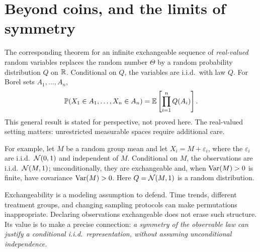 \section{Beyond coins, and the limits of symmetry}

The corresponding theorem for an infinite exchangeable sequence of \emph{real-valued} random variables replaces the random number $\Theta$ by a random probability distribution $Q$ on $\mathbb R$. Conditional on $Q$, the variables are i.i.d.\ with law $Q$. For Borel sets $A_1,\ldots,A_n$,
\[
\mathbb P(X_1\in A_1,\ldots,X_n\in A_n)
=\mathbb E\left[\prod_{i=1}^n Q(A_i)\right].
\]
This general result is stated for perspective, not proved here. The real-valued setting matters: unrestricted measurable spaces require additional care.

For example, let $M$ be a random group mean and let $X_i=M+\varepsilon_i$, where the $\varepsilon_i$ are i.i.d.\ $\mathcal N(0,1)$ and independent of $M$. Conditional on $M$, the observations are i.i.d.\ $\mathcal N(M,1)$; unconditionally, they are exchangeable and, when $\operatorname{Var}(M)>0$ is finite, have covariance $\operatorname{Var}(M)>0$. Here $Q=\mathcal N(M,1)$ is a random distribution.

Exchangeability is a modeling assumption to defend. Time trends, different treatment groups, and changing sampling protocols can make permutations inappropriate. Declaring observations exchangeable does not erase such structure. Its value is to make a precise connection: \emph{a symmetry of the observable law can justify a conditional i.i.d.\ representation, without assuming unconditional independence.}


